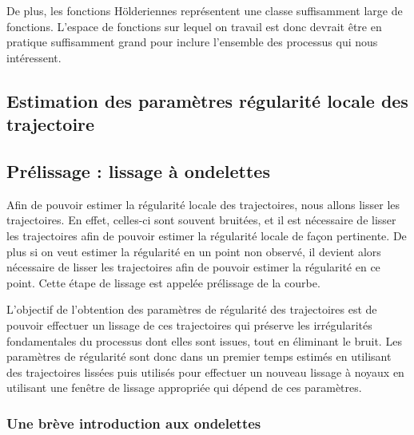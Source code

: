 De plus, les fonctions Hölderiennes représentent une classe suffisamment large de fonctions. L'espace de fonctions sur lequel on travail est donc devrait être en pratique suffisamment grand pour inclure l'ensemble des processus qui nous intéressent.




\subsection{Estimation des paramètres régularité locale des trajectoire}




\subsection{Prélissage : lissage à ondelettes}

Afin de pouvoir estimer la régularité locale des trajectoires, nous allons lisser les trajectoires. En effet, celles-ci sont souvent bruitées, et il est nécessaire de lisser les trajectoires afin de pouvoir estimer la régularité locale de façon pertinente. De plus si on veut estimer la régularité en un point non observé, il devient alors nécessaire de lisser les trajectoires afin de pouvoir estimer la régularité en ce point. Cette étape de lissage est appelée prélissage de la courbe.


L'objectif de l'obtention des paramètres de régularité des trajectoires est de pouvoir effectuer un lissage de ces trajectoires qui préserve les irrégularités fondamentales du processus dont elles sont issues, tout en éliminant le bruit. Les paramètres de régularité sont donc dans un premier temps estimés en utilisant des trajectoires lissées puis utilisés pour effectuer un nouveau lissage à noyaux en utilisant une fenêtre de lissage appropriée qui dépend de ces paramètres. 


\subsubsection{Une brève introduction aux ondelettes}


